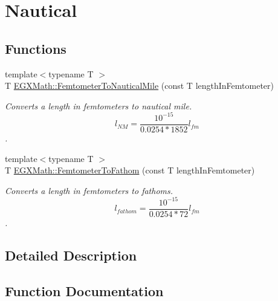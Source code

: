 \hypertarget{group___e_g_x_math-_conversions-_length_conversions-_femtometer-_nautical}{}\section{Nautical}
\label{group___e_g_x_math-_conversions-_length_conversions-_femtometer-_nautical}
\subsection*{Functions}
\begin{DoxyCompactItemize}
\item 
{\footnotesize template$<$typename T $>$ }\\T \mbox{\hyperlink{group___e_g_x_math-_conversions-_length_conversions-_femtometer-_nautical_gae44357e3e44868120d603cff76cefd77}{E\+G\+X\+Math\+::\+Femtometer\+To\+Nautical\+Mile}} (const T length\+In\+Femtometer)
\begin{DoxyCompactList}\small\item\em Converts a length in femtometers to nautical mile. \[ l_{NM}= \frac{10^{-15}}{0.0254 * 1852} l_{fm} \]. \end{DoxyCompactList}\item 
{\footnotesize template$<$typename T $>$ }\\T \mbox{\hyperlink{group___e_g_x_math-_conversions-_length_conversions-_femtometer-_nautical_ga2a7aadfe2325db467434f8bc9b2d9ed9}{E\+G\+X\+Math\+::\+Femtometer\+To\+Fathom}} (const T length\+In\+Femtometer)
\begin{DoxyCompactList}\small\item\em Converts a length in femtometers to fathoms. \[ l_{fathom}= \frac{10^{-15}}{0.0254 * 72} l_{fm} \]. \end{DoxyCompactList}\end{DoxyCompactItemize}


\subsection{Detailed Description}


\subsection{Function Documentation}
\mbox{\label{group___e_g_x_math-_conversions-_length_conversions-_femtometer-_nautical_ga2a7aadfe2325db467434f8bc9b2d9ed9}} 
